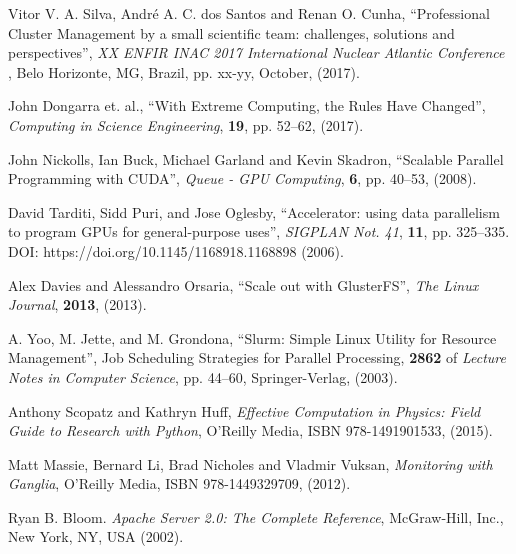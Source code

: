 \documentclass[twoside,a4paper,12pt,english]{inac19}
\begin{document}
\begin{thebibliography}{99} %

 Vitor V. A. Silva, Andr\'{e} A. C. dos Santos and Renan O. Cunha, ``Professional Cluster Management
  by a small scientific team: challenges, solutions and perspectives'', \textit{XX ENFIR INAC 2017 International Nuclear Atlantic Conference }, Belo Horizonte, MG, Brazil, pp. xx-yy, October, (2017). 
  
  
 John Dongarra et. al., ``With Extreme Computing, the Rules Have Changed'', \textit{Computing in Science Engineering}, \textbf{19}, pp. 52--62, (2017).
  
 John Nickolls, Ian Buck, Michael Garland and Kevin Skadron, ``Scalable Parallel Programming with CUDA'', \textit{Queue - GPU Computing}, \textbf{6}, pp. 40--53, (2008).
  
 David Tarditi, Sidd Puri, and Jose Oglesby, ``Accelerator: using data parallelism to program GPUs for general-purpose uses'',  \textit{SIGPLAN Not. 41}, \textbf{11}, pp. 325--335. DOI: https://doi.org/10.1145/1168918.1168898 (2006).

 Alex Davies and Alessandro Orsaria, ``Scale out with GlusterFS'', \textit{The Linux Journal}, \textbf{2013}, (2013).

 A. Yoo, M. Jette, and M. Grondona, ``Slurm: Simple Linux Utility for Resource Management'', Job Scheduling Strategies for Parallel Processing, \textbf{2862} of \textit{Lecture Notes in Computer Science}, pp. 44--60, Springer-Verlag, (2003).

   Anthony Scopatz and Kathryn Huff, \textit{Effective Computation in Physics: Field Guide to Research with Python}, O'Reilly Media, ISBN 978-1491901533, (2015).


 Matt Massie, Bernard Li, Brad Nicholes and Vladmir Vuksan, \textit{Monitoring with Ganglia}, O'Reilly Media, ISBN 978-1449329709, (2012).

 Ryan B. Bloom. \textit{Apache Server 2.0: The Complete Reference}, McGraw-Hill, Inc., New York, NY, USA (2002).
  

\end{thebibliography}
\end{document}
